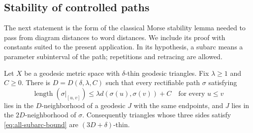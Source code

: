 \subsection{Stability of controlled paths}

The next statement is the form of the classical Morse stability lemma
\cite[Chapter~III.H, Theorem~1.7, p.~401]{BH1999} needed to pass from diagram distances to
word distances. We include its
proof with constants suited to the present application. In its hypothesis, a subarc means a parameter
subinterval of the path; repetitions and retracing are allowed.

\begin{lemma}
\label{lem:path-stability}
Let $X$ be a geodesic metric space with $\delta$-thin geodesic triangles.
Fix $\lambda\ge1$ and $C\ge0$. There is $D=D(\delta,\lambda,C)$ such that
every rectifiable path $\sigma$ satisfying
\begin{equation}
 \operatorname{length}(\sigma|_{[u,v]})
 \le\lambda d(\sigma(u),\sigma(v))+C
 \quad\text{for every }u\le v
 \label{eq:all-subarc-bound}
\end{equation}
lies in the $D$-neighborhood of a geodesic $J$ with the same endpoints,
and $J$ lies in the $2D$-neighborhood of $\sigma$.
Consequently triangles whose three sides satisfy
\eqref{eq:all-subarc-bound} are $(3D+\delta)$-thin.
\end{lemma}

